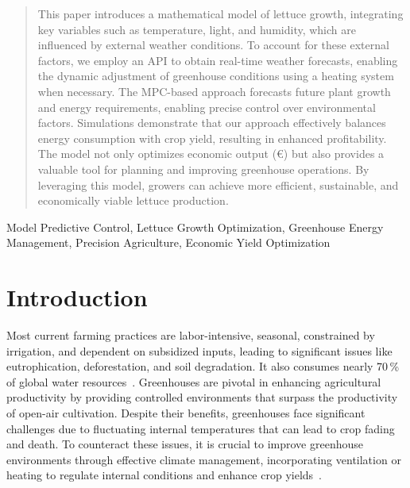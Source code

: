 \documentclass[conference]{IEEEtran}
\begin{document}
\begin{abstract}
    This paper introduces a mathematical model of lettuce growth, integrating key variables such as temperature, light, and humidity, which are influenced by external weather conditions. To account for these external factors, we employ an API to obtain real-time weather forecasts, enabling the dynamic adjustment of greenhouse conditions using a heating system when necessary. The MPC-based approach forecasts future plant growth and energy requirements, enabling precise control over environmental factors. Simulations demonstrate that our approach effectively balances energy consumption with crop yield, resulting in enhanced profitability. The model not only optimizes economic output (€) but also provides a valuable tool for planning and improving greenhouse operations.
    By leveraging this model, growers can achieve more efficient, sustainable, and economically viable lettuce production.
    \newline
\end{abstract}
\begin{IEEEkeywords}
    Model Predictive Control, Lettuce Growth Optimization, Greenhouse Energy Management, Precision Agriculture, Economic Yield Optimization
\end{IEEEkeywords}


\section{Introduction}
Most current farming practices are labor-intensive, seasonal, constrained by irrigation, and dependent on subsidized inputs, leading to significant issues like eutrophication, deforestation, and soil degradation. It also consumes nearly 70\,\% of global water resources~\cite{Debroy2024}. Greenhouses are pivotal in enhancing agricultural productivity by providing controlled environments that surpass the productivity of open-air cultivation. Despite their benefits, greenhouses face significant challenges due to fluctuating internal temperatures that can lead to crop fading and death. To counteract these issues, it is crucial to improve greenhouse environments through effective climate management, incorporating ventilation or heating to regulate internal conditions and enhance crop yields~\cite{Wu2019}.
\end{document}
